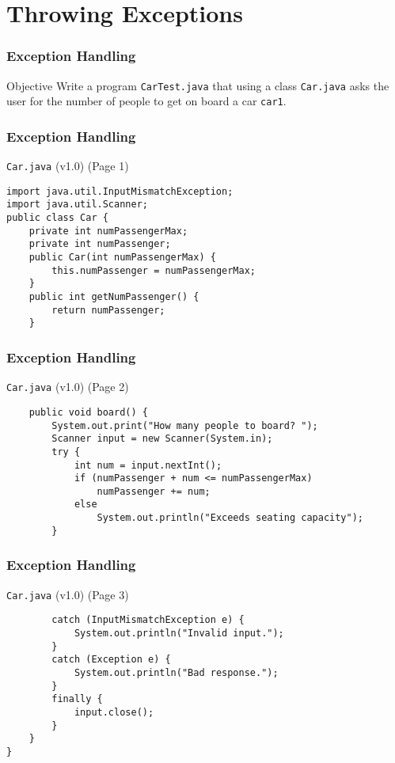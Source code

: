 \documentclass[10pt, compress]{beamer}
\begin{document}
\section{Throwing Exceptions}

\begin{frame}[fragile]
	\frametitle{Exception Handling}
	\begin{block}{Objective}
		Write a program \texttt{CarTest.java} that using a class \texttt{Car.java} asks the user for the number of people to get on board a car \texttt{car1}.
	\end{block}
\end{frame}

\begin{frame}[fragile]
	\frametitle{Exception Handling}
	\begin{block}{\texttt{Car.java} (v1.0) (Page 1)}
		\begin{verbatim}
import java.util.InputMismatchException;
import java.util.Scanner;
public class Car {
	private int numPassengerMax;
	private int numPassenger;
	public Car(int numPassengerMax) {
		this.numPassenger = numPassengerMax;
	}
	public int getNumPassenger() {
		return numPassenger;
	}
		\end{verbatim}
	\end{block}
\end{frame}

\begin{frame}[fragile]
	\frametitle{Exception Handling}
	\begin{block}{\texttt{Car.java} (v1.0) (Page 2)}
		\begin{verbatim}
	public void board() {
		System.out.print("How many people to board? ");
		Scanner input = new Scanner(System.in);
		try {
			int num = input.nextInt();
			if (numPassenger + num <= numPassengerMax)
				numPassenger += num;
			else
				System.out.println("Exceeds seating capacity");
		}
		\end{verbatim}
	\end{block}
\end{frame}

\begin{frame}[fragile]
	\frametitle{Exception Handling}
	\begin{block}{\texttt{Car.java} (v1.0) (Page 3)}
		\begin{verbatim}
		catch (InputMismatchException e) {
			System.out.println("Invalid input.");
		}
		catch (Exception e) {
			System.out.println("Bad response.");
		}
		finally {
			input.close();
		}
	}
}
		\end{verbatim}
	\end{block}
\end{frame}
\end{document}
